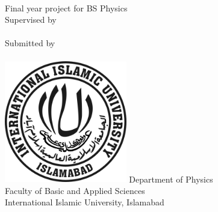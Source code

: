 \begin{titlepage}
    \begin{center}
        \LARGE
        \textbf{\Title}\\
        \vspace{0.5cm}
        \LARGE
        Final year project for BS Physics\\
        \vspace{1.5cm}
        \Large
        Supervised by\\
        \supervisor\\
        \vspace{0.5cm}
        Submitted by\\
        {\Author}\\
        \large
        \vspace{0.8cm}
        \vfill
        \includegraphics[width=0.4\textwidth]{title/iiui-logo.jpg}
        \vfill
        \Large
        Department of Physics\\
        Faculty of Basic and Applied Sciences\\
        International Islamic University, Islamabad\\
        \vfill
        \Date
    \end{center}
    
\end{titlepage}


